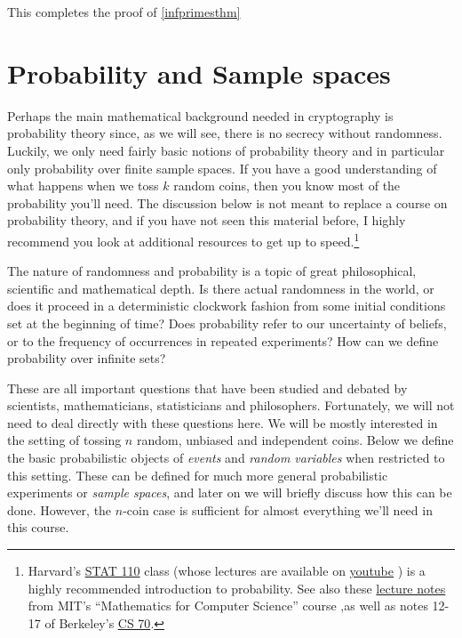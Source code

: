 This completes the proof of \cref{infprimesthm}

\section{Probability and Sample
spaces}\label{Probability-and-Sample-spaces}

Perhaps the main mathematical background needed in cryptography is
probability theory since, as we will see, there is no secrecy without
randomness. Luckily, we only need fairly basic notions of probability
theory and in particular only probability over finite sample spaces. If
you have a good understanding of what happens when we toss \(k\) random
coins, then you know most of the probability you'll need. The discussion
below is not meant to replace a course on probability theory, and if you
have not seen this material before, I highly recommend you look at
additional resources to get up to speed.\footnote{Harvard's
  \href{http://projects.iq.harvard.edu/stat110/home}{STAT 110} class
  (whose lectures are available on
  \href{http://projects.iq.harvard.edu/stat110/youtube}{youtube} ) is a
  highly recommended introduction to probability. See also these
  \href{http://www.boazbarak.org/cs121/LLM_probability.pdf}{lecture
  notes} from MIT's ``Mathematics for Computer Science'' course ,as well
  as notes 12-17 of Berkeley's \href{https://www.eecs70.org/}{CS 70}.}

The nature of randomness and probability is a topic of great
philosophical, scientific and mathematical depth. Is there actual
randomness in the world, or does it proceed in a deterministic clockwork
fashion from some initial conditions set at the beginning of time? Does
probability refer to our uncertainty of beliefs, or to the frequency of
occurrences in repeated experiments? How can we define probability over
infinite sets?

These are all important questions that have been studied and debated by
scientists, mathematicians, statisticians and philosophers. Fortunately,
we will not need to deal directly with these questions here. We will be
mostly interested in the setting of tossing \(n\) random, unbiased and
independent coins. Below we define the basic probabilistic objects of
\emph{events} and \emph{random variables} when restricted to this
setting. These can be defined for much more general probabilistic
experiments or \emph{sample spaces}, and later on we will briefly
discuss how this can be done. However, the \(n\)-coin case is sufficient
for almost everything we'll need in this course.

